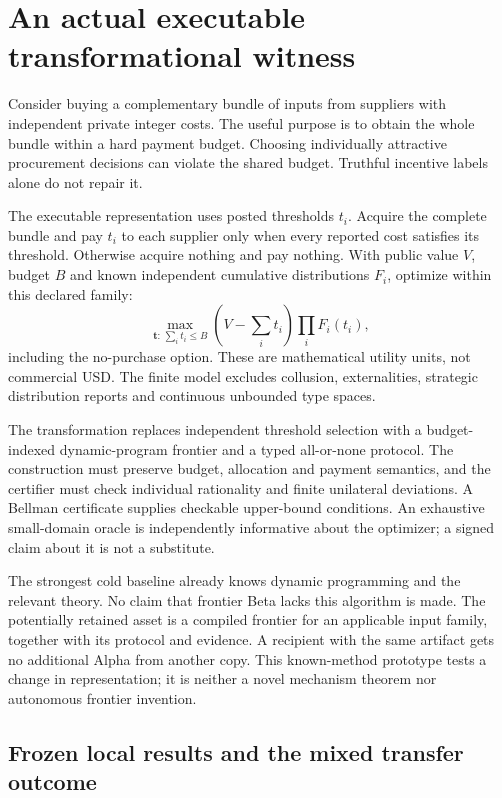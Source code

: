 \documentclass[11pt,letterpaper]{article}
\begin{document}
\section{An actual executable transformational witness}

Consider buying a complementary bundle of inputs from suppliers with independent
private integer costs. The useful purpose is to obtain the whole bundle within a
hard payment budget. Choosing individually attractive procurement decisions can
violate the shared budget. Truthful incentive labels alone do not repair it.

The executable representation uses posted thresholds $t_i$. Acquire the complete
bundle and pay $t_i$ to each supplier only when every reported cost satisfies its
threshold. Otherwise acquire nothing and pay nothing. With public value $V$,
budget $B$ and known independent cumulative distributions $F_i$, optimize within
this declared family:
\begin{equation}
\max_{\mathbf t:\,\sum_i t_i\le B}
\left(V-\sum_i t_i\right)\prod_i F_i(t_i),
\label{eq:mechanism}
\end{equation}
including the no-purchase option. These are mathematical utility units, not
commercial USD. The finite model excludes collusion, externalities, strategic
distribution reports and continuous unbounded type spaces.

The transformation replaces independent threshold selection with a
budget-indexed dynamic-program frontier and a typed all-or-none protocol.
The construction must preserve budget, allocation and payment semantics, and
the certifier must check individual rationality and finite unilateral deviations.
A Bellman certificate supplies checkable upper-bound conditions. An exhaustive
small-domain oracle is independently informative about the optimizer; a signed
claim about it is not a substitute.

The strongest cold baseline already knows dynamic programming and the relevant
theory. No claim that frontier Beta lacks this algorithm is made. The potentially
retained asset is a compiled frontier for an applicable input family, together
with its protocol and evidence. A recipient with the same artifact gets no
additional Alpha from another copy.
This known-method prototype tests a change in representation; it is neither a
novel mechanism theorem nor autonomous frontier invention.

\subsection{Frozen local results and the mixed transfer outcome}
\end{document}
